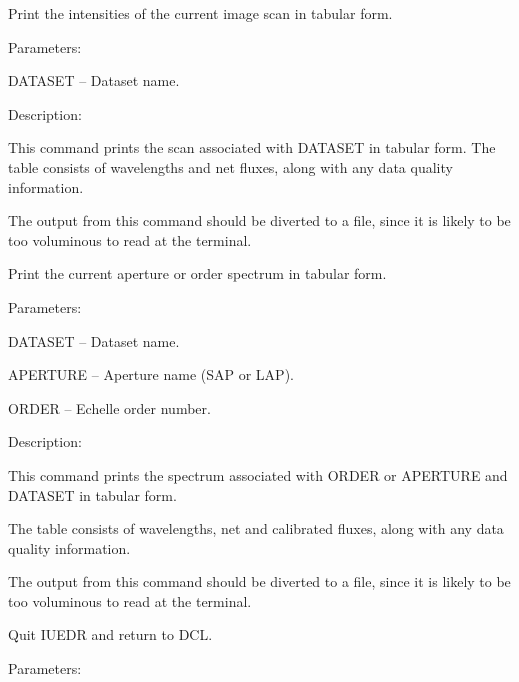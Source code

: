 \begin {description}
\item [PRSCAN]
Print the intensities of the current image scan in tabular form.

\begin {description}
\item Parameters:

\begin {description}
\item DATASET -- Dataset name.
\end {description}

\item Description:

This command prints the scan associated with DATASET in tabular form.
The table consists of wavelengths and net fluxes, along
with any data quality information.

The output from this command should be diverted to a file, since
it is likely to be too voluminous to read at the terminal.
\end {description}

\item [PRSPEC]
Print the current aperture or order spectrum in tabular form.

\begin {description}
\item Parameters:

\begin {description}
\item DATASET -- Dataset name.
\item APERTURE -- Aperture name (SAP or LAP).
\item ORDER -- Echelle order number.
\end {description}

\item Description:

This command prints the spectrum associated with ORDER or APERTURE
and DATASET in tabular form.

The table consists of wavelengths, net and calibrated fluxes, along
with any data quality information.

The output from this command should be diverted to a file, since
it is likely to be too voluminous to read at the terminal.
\end {description}

\item [QUIT]
Quit IUEDR and return to DCL.

\begin {description}
\item Parameters:


\end{description}
\end{description}
